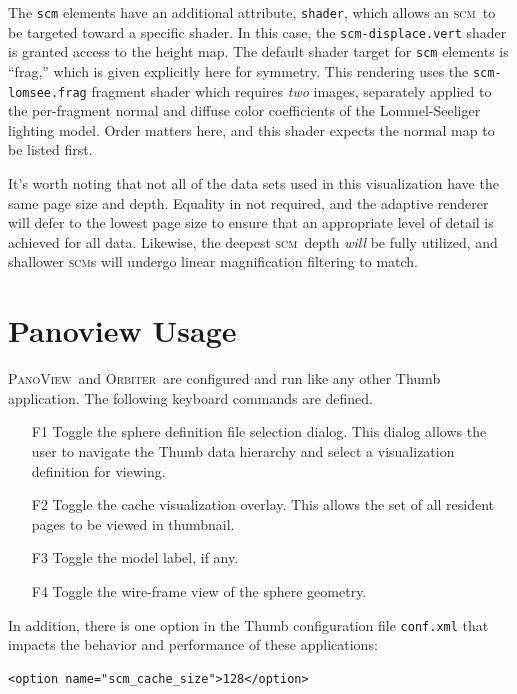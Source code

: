 \documentclass[oneside,10pt]{memoir}
\newcommand{\scm}     {\textsc{scm}}
\newcommand{\panoview}{\textsc{PanoView}}
\newcommand{\orbiter} {\textsc{Orbiter}}
\begin{document}
\begin{Spacing}{1.1}
The \texttt{scm} elements have an additional attribute, \texttt{shader}, which allows an \scm\ to be targeted toward a specific shader. In this case, the \texttt{scm-displace.vert} shader is granted access to the height map. The default shader target for \texttt{scm} elements is ``frag,'' which is given explicitly here for symmetry. This rendering uses the \texttt{scm-lomsee.frag} fragment shader which requires \emph{two} images, separately applied to the per-fragment normal and diffuse color coefficients of the Lommel-Seeliger lighting model. Order matters here, and this shader expects the normal map to be listed first.

It's worth noting that not all of the data sets used in this visualization have the same page size and depth. Equality in not required, and the adaptive renderer will defer to the lowest page size to ensure that an appropriate level of detail is achieved for all data. Likewise, the deepest \scm\ depth \emph{will} be fully utilized, and shallower \scm s will undergo linear magnification filtering to match.

\section{Panoview Usage}

\panoview\ and \orbiter\ are configured and run like any other Thumb application. The following keyboard commands are defined.

\begin{itemize}
\item[F1] Toggle the sphere definition file selection dialog. This dialog allows the user to navigate the Thumb data hierarchy and select a visualization definition for viewing.

\item[F2] Toggle the cache visualization overlay. This allows the set of all resident pages to be viewed in thumbnail.

\item[F3] Toggle the model label, if any.

\item[F4] Toggle the wire-frame view of the sphere geometry.

\end{itemize}

In addition, there is one option in the Thumb configuration file \texttt{conf.xml} that impacts the behavior and performance of these applications:

\begin{Verbatim}
<option name="scm_cache_size">128</option>
\end{Verbatim}


\end{Spacing}
\end{document}
